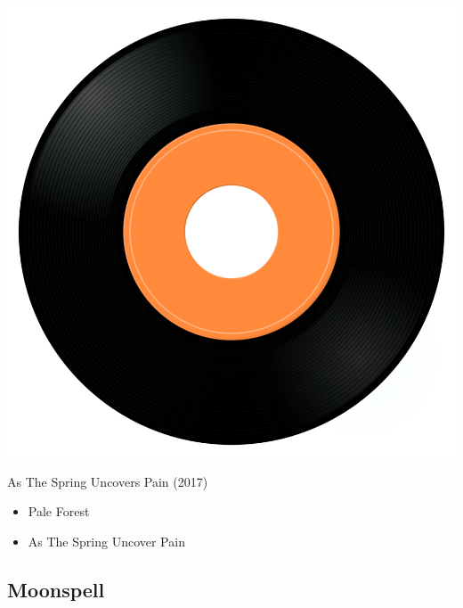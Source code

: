 \begin{minipage}[t]{0.25\textwidth}
\captionsetup{type=figure}
\includegraphics[width=\textwidth]{Images/cover.png}
\caption*{As The Spring Uncovers Pain (2017)}
\end{minipage}
\begin{minipage}[t]{0.25\textwidth}\vspace{0pt}
\begin{itemize}[nosep,leftmargin=1em,labelwidth=*,align=left]
	\setlength{\itemsep}{0pt}
	\item Pale Forest
	\item As The Spring Uncover Pain
\end{itemize}
\end{minipage}

\subsection{Moonspell}

